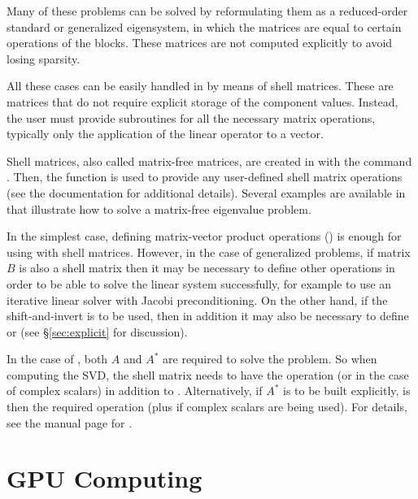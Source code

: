 	Many of these problems can be solved by reformulating them as a reduced-order standard or generalized eigensystem, in which the matrices are equal to certain operations of the blocks. These matrices are not computed explicitly to avoid losing sparsity.

	All these cases can be easily handled in \slepc by means of shell matrices. These are matrices that do not require explicit storage of the component values. Instead, the user must provide subroutines for all the necessary matrix operations, typically only the application of the linear operator to a vector. 

	Shell matrices, also called matrix-free matrices, are created in \petsc with the command . Then, the function  is used to provide any user-defined shell matrix operations (see the \petsc{} documentation for additional details). Several examples are available in \slepc that illustrate how to solve a matrix-free eigenvalue problem.

	In the simplest case, defining matrix-vector product operations () is enough for using  with shell matrices. However, in the case of generalized problems, if matrix $B$ is also a shell matrix then it may be necessary to define other operations in order to be able to solve the linear system successfully, for example  to use an iterative linear solver with Jacobi preconditioning. On the other hand, if the shift-and-invert  is to be used, then in addition it may also be necessary to define  or  (see \S\ref{sec:explicit} for discussion).

	In the case of , both $A$ and $A^*$ are required to solve the problem. So when computing the SVD, the shell matrix needs to have the  operation (or  in the case of complex scalars) in addition to . Alternatively, if $A^*$ is to be built explicitly,  is then the required operation (plus  if complex scalars are being used). For details, see the manual page for .

\section{GPU Computing}
\label{sec:gpu}

